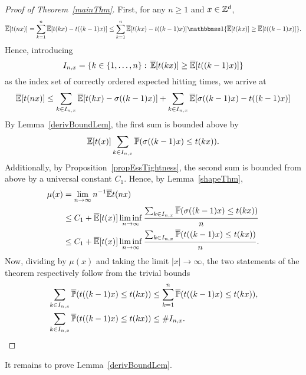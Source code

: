 \begin{proof}[Proof of Theorem~\ref{mainThm}]
	First, for any $n \ge 1$ and $x\in{\mathbb{Z}^d}$, 
	$$\oE[\t(nx)] = \sum_{k = 1}^n \oE[\t(kx) - \t((k-1)x)] \le \sum_{k = 1}^n \oE[\t(kx) - \t((k-1)x)] \one \{\oE[\t(kx)] \ge \oE[\t((k-1)x)]\}.$$
	Hence, introducing 
	$$I_{n,x} = \{k \in \{1,\ldots, n \}:\, \overline{\mathbb{E}}[t(kx)] \ge \overline{\mathbb{E}}[t((k-1)x)]\}$$
	as the index set of correctly ordered expected hitting times, we arrive at 
		$$\overline{\mathbb{E}}[t(nx)] \le \sum_{k \in I_{n,x}} \overline{\mathbb{E}}[t(kx) - \sigma((k-1)x)] + \sum_{k \in I_{n,x}}\overline{\mathbb{E}}[\sigma((k-1)x) - t((k-1)x)]$$
	By Lemma~\ref{derivBoundLem}, the first sum is bounded above by 
		$$\overline{\mathbb{E}}[t(x)]\sum_{k \in I_{n,x}}\overline{\mathbb{P}}(\sigma((k-1) x) \le t(k x)) .$$
		Additionally, by Proposition~\ref{propEssTightness}, the second sum is bounded from above by a universal constant $C_1$. Hence, by Lemma~\ref{shapeThm}, 
		\begin{align*}
			\mu(x) &= \lim_{n \to \infty}n^{-1} \overline{\mathbb{E}} t(nx) \\ 
			&\le C_1 + \overline{\mathbb{E}}[t(x)] \liminf_{n \to \infty}\frac{\sum_{k \in I_{n,x}}\overline{\mathbb{P}}(\sigma((k-1) x) \le t(k x)) }{n}\\
			&\le C_1 + \overline{\mathbb{E}}[t(x)] \liminf_{n \to \infty}\frac{\sum_{k \in I_{n,x}}\overline{\mathbb{P}}(t((k-1) x) \le t(k x)) }{n}.
		\end{align*}
Now, dividing by $\mu(x)$ and taking the limit $|x| \to \infty$, the two statements of the theorem respectively follow from the trivial bounds
\begin{align*}& \sum_{k \in I_{n,x}}\overline{\mathbb{P}}(t((k-1) x) \le t(k x)) \leq \sum_{k=1}^n\overline{\mathbb{P}}(t((k-1) x) \le t(k x)), \\& \sum_{k \in I_{n,x}}\overline{\mathbb{P}}(t((k-1) x) \le t(k x)) \leq \#I_{n,x}.
\end{align*}
\end{proof}

It remains to prove Lemma~\ref{derivBoundLem}.

